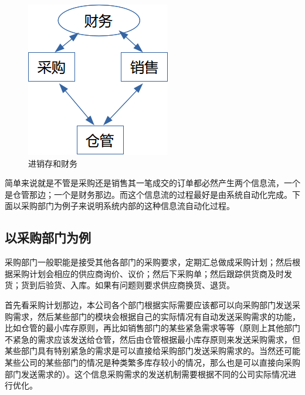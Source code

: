 \documentclass[11pt,a4paper]{sphinxmanual}
\begin{document}
\begin{figure}[H]
\centering
\includegraphics[keepaspectratio,max width=0.95\linewidth]{images/进销存和财务.png}
\caption{进销存和财务}
\end{figure}

简单来说就是不管是采购还是销售其一笔成交的订单都必然产生两个信息流，一个是仓管那边；一个是财务那边。而这个信息流的过程最好是由系统自动化完成。下面以采购部门为例子来说明系统内部的这种信息流自动化过程。

\subsection{以采购部门为例}
\label{sec-4-9-1}
采购部门一般职能是接受其他各部门的采购要求，定期汇总做成采购计划；然后根据采购计划会相应的供应商询价、议价；然后下采购单；然后跟踪供货商及时发货；货到后验货、入库。如果有问题则要求供应商换货、退货。

首先看采购计划那边，本公司各个部门根据实际需要应该都可以向采购部门发送采购需求，然后某些部门的模块会根据自己的实际情况有自动发送采购需求的功能，比如仓管的最小库存原则，再比如销售部门的某些紧急需求等等（原则上其他部门不紧急的需求应该发送给仓管，然后由仓管根据最小库存原则来发送采购需求，但某些部门具有特别紧急的需求是可以直接给采购部门发送采购需求的。当然还可能某些公司的某些部门的情况是种类繁多库存较小的情况，那么也是可以直接向采购部门发送需求的）。这个信息采购需求的发送机制需要根据不同的公司实际情况进行优化。
\end{document}
